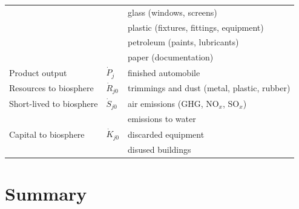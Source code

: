 \begin{table}
\begin{center}
\begin{tabular}{p{4cm}p{1cm}p{5.2cm}}
												&								&	 	glass (windows, screens)						\\
												&								&	 plastic (fixtures, fittings, equipment)		\\
												&								&	 	petroleum (paints, lubricants)				\\
												&								&	 paper (documentation)							\\
\midrule
Product output							&	$\dot{P}_{j}$		&	finished automobile									\\
\midrule
Resources to biosphere			& $\dot{R}_{j0}$		&	trimmings and dust (metal, plastic, rubber)	\\[0.15cm]
Short-lived to biosphere			& $\dot{S}_{j0}$		&	air emissions (GHG, NO$_x$, SO$_x$)		\\
												&								& emissions to water									\\[0.15cm]
Capital to biosphere					& $\dot{K}_{j0}$	&	discarded equipment								\\
												&								& disused buildings										\\
\bottomrule
\end{tabular}
\end{center}
\label{tab:materials_auto}
\end{table}


\section{Summary}
\label{sec:materials_summary}







%
%

